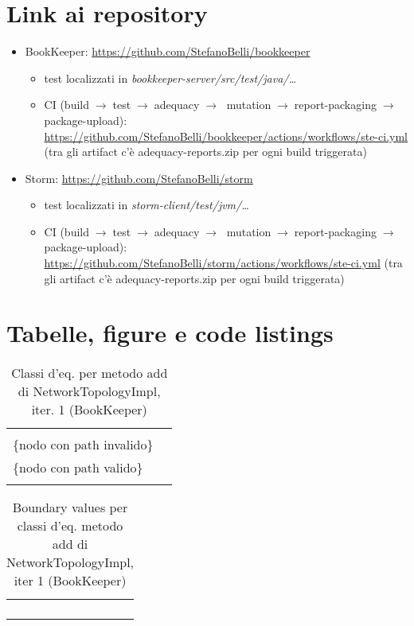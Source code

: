 \documentclass[10pt, a4paper]{article}
\newcommand{\Intmaketable}[4]{
	\begin{longtable}{#3}
	#4
	\caption{#2}
	\label{#1}
	\end{longtable}
}
\newcommand{\Intceqtable}[3]{
	\Intmaketable{#1}{#2}{|l|l|}{
	\hline
	\thead{Parametro formale} & \thead{Classi d'equivalenza} \\
	\hline
	\hline
	#3
	\hline}
}
\newcommand{\Intbvtable}[3]{
	\Intmaketable{#1}{#2}{|l|l|l|}{
	\hline
	\thead{Parametro formale} & \thead{Classe d'equivalenza} & \thead{Boundary value}\\
	\hline
	\hline
	#3
	\hline}
}
\newcommand{\Intceqcaption}[4]{Classi d'eq. per metodo #1 di #2, iter. #3 (#4)}
\newcommand{\Intbvcaption}[4]{Boundary values per classi d'eq. metodo #1 di #2, iter #3 (#4)}
\newcommand{\gettablelabel}[5]{table:#1:#2:#3:iter#4:proj#5}
\newcommand{\ceqtable}[5]{
	\Intceqtable{\gettablelabel{ceq}{#1}{#2}{#3}{#4}}
		{\Intceqcaption{#1}{#2}{#3}{#4}}
		{#5}
}
\newcommand{\bvtable}[5]{
	\Intbvtable{\gettablelabel{bv}{#1}{#2}{#3}{#4}}
		{\Intbvcaption{#1}{#2}{#3}{#4}}
		{#5}
}
\newcommand{\tcell}{\makecell[tl]}
\newcommand{\newtrow}{\\ \hline}
\def\bookkeeper{BookKeeper}
\newcommand{\ceq}[1]{\{#1\}}
\begin{document}
	\section{Link ai repository}
	\begin{itemize}
		\item BookKeeper: \url{https://github.com/StefanoBelli/bookkeeper}
		\begin{itemize}
			\item test localizzati in \textit{bookkeeper-server/src/test/java/\dots}
			\item CI (build$\;\rightarrow\;$test$\;\rightarrow\;$adequacy$\;\rightarrow\;$
			mutation$\;\rightarrow\;$report-packaging$\;\rightarrow\;$package-upload): 
			\url{https://github.com/StefanoBelli/bookkeeper/actions/workflows/ste-ci.yml} 
			(tra gli artifact c'è adequacy-reports.zip per ogni build triggerata)
		\end{itemize}
		\item Storm: \url{https://github.com/StefanoBelli/storm}
		\begin{itemize}
			\item test localizzati in \textit{storm-client/test/jvm/\dots}
			\item CI (build$\;\rightarrow\;$test$\;\rightarrow\;$adequacy$\;\rightarrow\;$
			mutation$\;\rightarrow\;$report-packaging$\;\rightarrow\;$package-upload): 
			\url{https://github.com/StefanoBelli/storm/actions/workflows/ste-ci.yml}
			(tra gli artifact c'è adequacy-reports.zip per ogni build triggerata)
		\end{itemize}
	\end{itemize}
	
	\newpage
	\section{Tabelle, figure e code listings}
	
	
	\ceqtable{add}{NetworkTopologyImpl}{1}{\bookkeeper}{
			\tcell{node} & \tcell{\ceq{null} \\ \ceq{nodo con path invalido} \\ \ceq{nodo con path valido} }
		\newtrow
	}
	
	\bvtable{add}{NetworkTopologyImpl}{1}{\bookkeeper}{
			\tcell{node} & \tcell{\ceq{null}} & \tcell{null}
		\newtrow
			\tcell{node} & \tcell{\ceq{nodo con path invalido}} & \tcell{Node("/bookie-1")}
		\newtrow
			\tcell{node} & \tcell{\ceq{nodo con path valido}} & \tcell{Node("/rack-1/bookie-1")}
		\newtrow
	}
	
\end{document}
